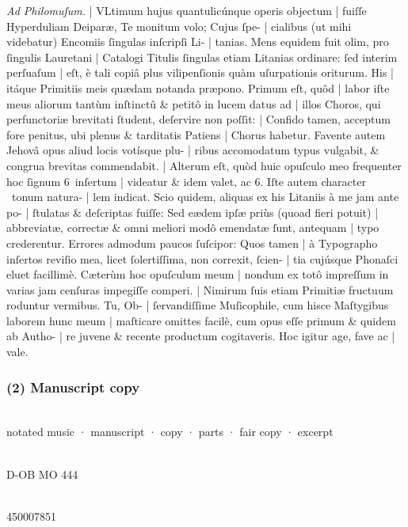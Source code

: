 \documentclass[abbrwidth=7em,shorttitlesize=55]{ees}
\def\slashedsix{6\llap{/\hspace*{.1em}}}
\begin{document}
\begin{flushleft}
\begin{description}[labelwidth=3em,leftmargin=3.5em]
  \item[fol. 3v] \textit{Ad Philomuſum.} | VLtimum hujus quantulicúnque operis objectum | fuiſſe Hyperduliam Deiparæ, Te monitum volo; Cujus ſpe- | cialibus (ut mihi videbatur) Encomiis ſingulas inſcripſi Li- | tanias. Mens equidem fuit olim, pro ſingulis Lauretani | Catalogi Titulis ſingulas etiam Litanias ordinare: ſed interim perſuaſum | eſt, è tali copiâ plus vilipenſionis quàm uſurpationis oriturum. His | itáque Primitiis meis quædam notanda præpono. Primum eſt, quôd | labor iſte meus aliorum tantùm inſtinctû \& petitô in lucem datus ad | illos Choros, qui perfunctoriæ brevitati ſtudent, deſervire non poſſit: | Confido tamen, acceptum fore penitus, ubi plenus \& tarditatis Patiens | Chorus habetur. Favente autem Jehovâ opus aliud locis votísque plu- | ribus accomodatum typus vulgabit, \& congrua brevitas commendabit. | Alterum eſt, quòd huic opuſculo meo frequenter hoc ſignum \slashedsix\ inſertum | videatur \& idem valet, ac \sharp{}6. Iſte autem character \natural{}\ tonum natura- | lem indicat. Scio quidem, aliquas ex his Litaniis à me jam ante po- | ſtulatas \& deſcriptas fuiſſe: Sed eædem ipſæ priùs (quoad fieri potuit) | abbreviatæ, correctæ \& omni meliori modô emendatæ ſunt, antequam | typo crederentur. Errores admodum paucos ſuſcipor: Quos tamen | à Typographo inſertos reviſio mea, licet ſolertiſſima, non correxit, ſcien- | tia cujúsque Phonaſci eluet facillimè. Cæterùm hoc opuſculum meum | nondum ex totô impreſſum in varias jam cenſuras impegiſſe comperi. | Nimirum ſuis etiam Primitiæ fructuum roduntur vermibus. Tu, Ob- | ſervandiſſime Muſicophile, cum hisce Maſtygibus laborem hunc meum | maſticare omittes facilè, cum opus eſſe primum \& quidem ab Autho- | re juvene \& recente productum cogitaveris. Hoc igitur age, fave ac | vale.
\end{description}
\end{flushleft}


\subsubsection{(2) Manuscript copy}

\\
notated music · manuscript · copy · parts · fair copy · excerpt

\\
D-OB MO 444

\\
450007851
\end{document}
